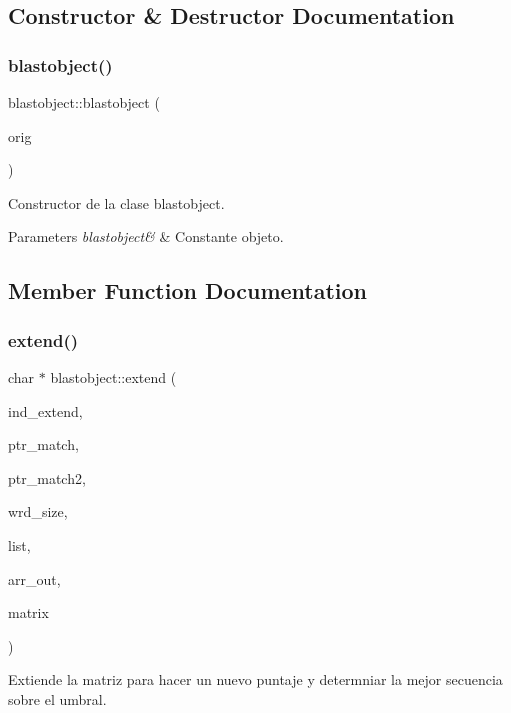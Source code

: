 \subsection{Constructor \& Destructor Documentation}
\label{classblastobject_aa6004c11726327285515febd40f26b28} 
\subsubsection{blastobject()}
{\footnotesize\ttfamily blastobject\+::blastobject (\begin{DoxyParamCaption}\item[{const {\bf blastobject} \&}]{orig }\end{DoxyParamCaption})}



Constructor de la clase blastobject. 


\begin{DoxyParams}{Parameters}
{\em blastobject\&} & Constante objeto. \\
\hline
\end{DoxyParams}


\subsection{Member Function Documentation}
\label{classblastobject_aedb4c8c7bdc5fd5823003ef213681bde} 
\subsubsection{extend()}
{\footnotesize\ttfamily char $\ast$ blastobject\+::extend (\begin{DoxyParamCaption}\item[{int}]{ind\+\_\+extend,  }\item[{int}]{ptr\+\_\+match,  }\item[{int}]{ptr\+\_\+match2,  }\item[{int}]{wrd\+\_\+size,  }\item[{char $\ast$$\ast$}]{list,  }\item[{char $\ast$}]{arr\+\_\+out,  }\item[{double $\ast$}]{matrix }\end{DoxyParamCaption})}



Extiende la matriz para hacer un nuevo puntaje y determniar la mejor secuencia sobre el umbral. 


